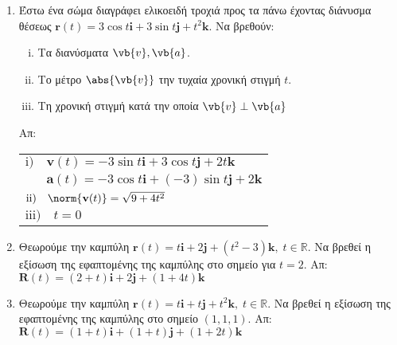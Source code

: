 



\usepackage{array}
\pagestyle{askhseis}
\everymath{\displaystyle}



\begin{center}
  \minibox{\large \bfseries \textcolor{Col1}{Καμπύλες (Ασκήσεις)}}
\end{center}

\vspace{\baselineskip}

\begin{enumerate}
  \item Έστω ένα σώμα διαγράφει ελικοειδή τροχιά προς τα πάνω έχοντας διάνυσμα θέσεως 
    $\mathbf{r}(t) = 3\cos t \mathbf{i} + 3\sin t \mathbf{j} + t^2 \mathbf{k}$. 
    Να βρεθούν:
    \begin{enumerate}[i)]
      \item Τα διανύσματα $\vb{v}, \vb{a}$.
      \item Το μέτρο $\abs{\vb{v}}$ την τυχαία χρονική στιγμή $t$.
      \item Τη χρονική στιγμή κατά την οποία $\vb{v}\perp\vb{a}$
    \end{enumerate}
    \hfill Απ: \begin{tabular}{l}
      $ \mathrm{i)} \quad 
      \mathbf{v}(t) = -3\sin{t} \mathbf{i} + 3\cos t \mathbf{j} + 2t \mathbf{k} $ \\
      $\phantom{\mathrm{i)}} \quad 
      \mathbf{a}(t) = -3\cos t \mathbf{i} + (-3)\sin t \mathbf{j} + 2 \mathbf{k} $ \\
      $ \mathrm{ii)} \quad \norm{\mathbf{v}(t)} = \sqrt{9+4t^{2}} $ \\
      $ \mathrm{iii)} \quad t=0$
    \end{tabular}

  \item Θεωρούμε την καμπύλη $ \mathbf{r}(t) = t \mathbf{i} + 2 \mathbf{j} + (t^{2}-3)
    \mathbf{k}, \; t \in \mathbb{R} $. Να βρεθεί η εξίσωση της εφαπτομένης της καμπύλης 
    στο σημείο για $ t = 2 $.
    \hfill Απ: $ \mathbf{R}(t) = (2+t) \mathbf{i} + 2 \mathbf{j} + (1+4t) \mathbf{k}$ 

  \item Θεωρούμε την καμπύλη $ \mathbf{r}(t) = t \mathbf{i} + t \mathbf{j} + t^{2}
    \mathbf{k}, \; t \in \mathbb{R} $. Να βρεθεί η εξίσωση της εφαπτομένης της καμπύλης 
    στο σημείο $ (1,1,1) $.
    \hfill Απ: $ \mathbf{R}(t) = (1+t) \mathbf{i} + (1+t) \mathbf{j} + (1+2t) 
    \mathbf{k} $ 


\end{enumerate}
